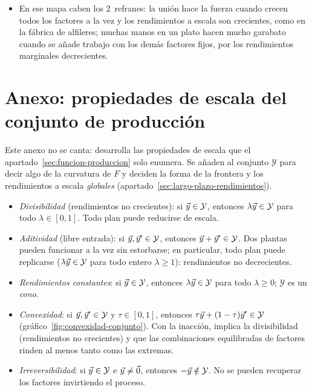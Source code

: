 \documentclass[11pt]{article}
\begin{document}
\begin{itemize}
\begin{itemize}
  \item En ese mapa caben los 2~refranes: la unión hace la fuerza cuando crecen todos los factores a la vez y los rendimientos a escala son crecientes, como en la fábrica de alfileres; muchas manos en un plato hacen mucho garabato cuando se añade trabajo con los demás factores fijos, por los rendimientos marginales decrecientes.
  \end{itemize}
\end{itemize}

\clearpage
\appendix

\section{Anexo: propiedades de escala\cortetitulo{} del conjunto de producción}\label{anexo:escala}

Este anexo no se canta: desarrolla las propiedades de escala que el apartado~\ref{sec:funcion-produccion} solo enumera. Se añaden al conjunto $\mathcal{Y}$ para decir algo de la curvatura de $F$ y deciden la forma de la frontera y los rendimientos a escala \emph{globales} (apartado~\ref{sec:largo-plazo-rendimientos})\nocite{MasColellWhinstonGreen1995}.

\begin{itemize}
\item \emph{Divisibilidad} (rendimientos no crecientes): si $\vec{y}\in\mathcal{Y}$, entonces $\lambda\vec{y}\in\mathcal{Y}$ para todo $\lambda\in[0,1]$. Todo plan puede reducirse de escala.
\item \emph{Aditividad} (libre entrada): si $\vec{y},\vec{y}'\in\mathcal{Y}$, entonces $\vec{y}+\vec{y}'\in\mathcal{Y}$. Dos plantas pueden funcionar a la vez sin estorbarse; en particular, todo plan puede replicarse ($\lambda\vec{y}\in\mathcal{Y}$ para todo entero $\lambda\geq 1$): rendimientos no decrecientes.
\item \emph{Rendimientos constantes}: si $\vec{y}\in\mathcal{Y}$, entonces $\lambda\vec{y}\in\mathcal{Y}$ para todo $\lambda\geq 0$; $\mathcal{Y}$ es un \emph{cono}.
\item \emph{Convexidad}: si $\vec{y},\vec{y}'\in\mathcal{Y}$ y $\tau\in[0,1]$, entonces $\tau\vec{y}+(1-\tau)\vec{y}'\in\mathcal{Y}$ (gráfico~\ref{fig:convexidad-conjunto}). Con la inacción, implica la divisibilidad (rendimientos no crecientes) y que las combinaciones equilibradas de factores rinden al menos tanto como las extremas.
\item \emph{Irreversibilidad}: si $\vec{y}\in\mathcal{Y}$ e $\vec{y}\neq\vec{0}$, entonces $-\vec{y}\notin\mathcal{Y}$. No se pueden recuperar los factores invirtiendo el proceso.
\end{itemize}
\end{document}
